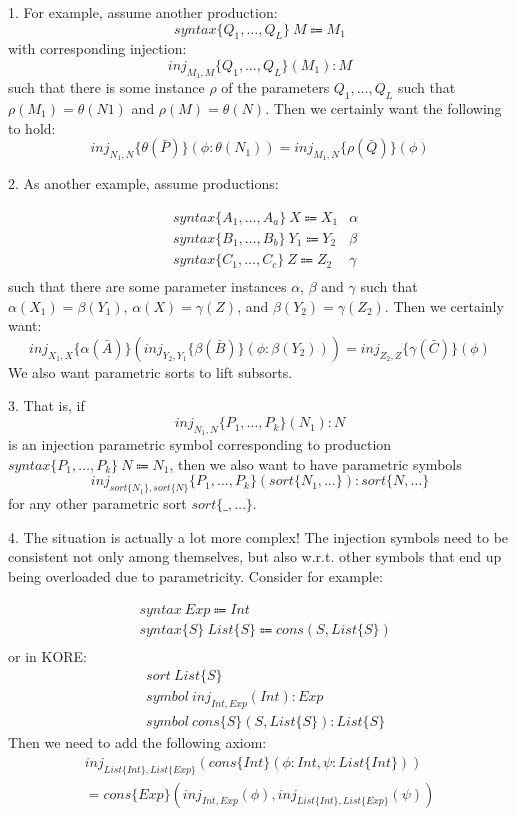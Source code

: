 \documentclass[UTF8,11pt]{article}
\theoremstyle{plain}
\theoremstyle{definition}
\theoremstyle{remark}
\begin{document}
1. For example, assume another production:
\[syntax \{Q_1, \dots,Q_L\} \ M \Coloneqq M_1\]
with corresponding injection:
\[inj_{M_1,M}\{Q_1, \dots,Q_L\}(M_1):M\]
such that there is some instance $\rho$ of the parameters $Q_1, \dots,Q_L$ such that $\rho(M_1) = \theta(N1)$ and $\rho(M) = \theta(N)$. Then we certainly want the following to hold:
\[inj_{N_1,N}\{\theta(\bar{P})\}(\phi:\theta(N_1))=inj_{M_1,N}\{\rho(\bar{Q})\}(\phi)\]

2. As another example, assume productions:

\begin{align*}
&syntax \{A_1, \dots,A_a\} \ X \Coloneqq X_1     & \alpha \\ 
&syntax \{B_1, \dots,B_b\} \ Y_1 \Coloneqq Y_2 & \beta \\
&syntax \{C_1, \dots,C_c\} \ Z \Coloneqq Z_2     & \gamma \\
\end{align*}
such that there are some parameter instances $\alpha$, $\beta$ and $\gamma$ such that $\alpha(X_1)=\beta(Y_1)$, $\alpha(X)=\gamma(Z)$, and $\beta(Y_2)=\gamma(Z_2)$. Then we certainly want:
\[inj_{X_1,X}\{\alpha(\bar{A})\}(inj_{Y_2,Y_1}\{\beta(\bar{B})\}(\phi:\beta(Y_2)))=inj_{Z_2,Z}\{\gamma(\bar{C})\}(\phi)\]
We also want parametric sorts to lift subsorts.

3. That is, if
\[inj_{N_1,N}\{P_1, \dots,P_k\}(N_1):N\]
is an injection parametric symbol corresponding to production $syntax \{P_1, \dots,P_k\} \ N \Coloneqq N_1$, then we also want to have parametric symbols
\[inj_{sort\{N_1\},sort\{N\}}\{P_1, \dots,P_k\}(sort\{N_1,\dots\}):sort\{N,\dots\}\]
for any other parametric sort $sort\{\_,\dots\}$.

4. The situation is actually a lot more complex! The injection symbols need to be consistent not only among themselves, but also w.r.t. other symbols that end up being overloaded due to parametricity. Consider for example:

\begin{align*}
&syntax\ Exp \Coloneqq Int\\ 
&syntax \{S\} \ List\{S\} \Coloneqq cons(S, List\{S\}) \\
\end{align*}
or in KORE:
\begin{align*}
&sort\ List\{S\} \\ 
&symbol\ inj_{Int,Exp}(Int):Exp \\
&symbol\ cons\{S\}(S,List\{S\}):List\{S\}
\end{align*}
Then we need to add the following axiom:
\begin{align*}
inj_{List\{Int\},List\{Exp\}}(cons\{Int\}(\phi:Int,\psi:List\{Int\}))\\ =cons\{Exp\}(inj_{Int,Exp}(\phi),inj_{List\{Int\},List\{Exp\}}(\psi))
\end{align*}
\end{document}
